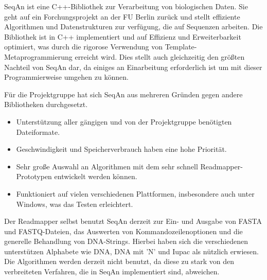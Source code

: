 SeqAn ist eine C++-Bibliothek zur Verarbeitung von biologischen Daten. Sie geht
auf ein Forchungsprojekt an der FU Berlin zurück und
stellt effiziente Algorithmen und Datenstrukturen zur verfügung, die auf
Sequenzen arbeiten. Die Bibliothek ist in C++ implementiert und auf Effizienz
und Erweiterbarkeit optimiert, was durch die rigorose Verwendung von
Template-Metaprogrammierung erreicht wird. Dies stellt auch gleichzeitig den
größten Nachteil von SeqAn dar, da einiges an Einarbeitung erforderlich ist um
mit dieser Programmierweise umgehen zu können.

Für die Projektgruppe hat sich SeqAn aus mehreren Gründen gegen andere
Bibliotheken durchgesetzt.

\begin{itemize}
	\item Unterstützung aller gängigen und von der Projektgruppe benötigten
          Dateiformate.
        \item Geschwindigkeit und Speicherverbrauch haben eine hohe Priorität.
	\item Sehr große Auswahl an Algorithmen mit dem sehr schnell
          Readmapper-Prototypen entwickelt werden können.
	\item Funktioniert auf vielen verschiedenen Plattformen, insbesondere
          auch unter Windows, was das Testen erleichtert.
\end{itemize}

Der Readmapper selbst benutzt SeqAn derzeit zur Ein- und Ausgabe von FASTA und
FASTQ-Dateien, das Auswerten von Kommandozeilenoptionen und die generelle
Behandlung von DNA-Strings. Hierbei haben sich die verschiedenen unterstützen
Alphabete wie DNA, DNA mit 'N' und Iupac als nützlich erwiesen. Die Algorithmen
werden derzeit nicht benutzt, da diese zu stark von den verbreiteten Verfahren,
die in SeqAn implementiert sind, abweichen.

